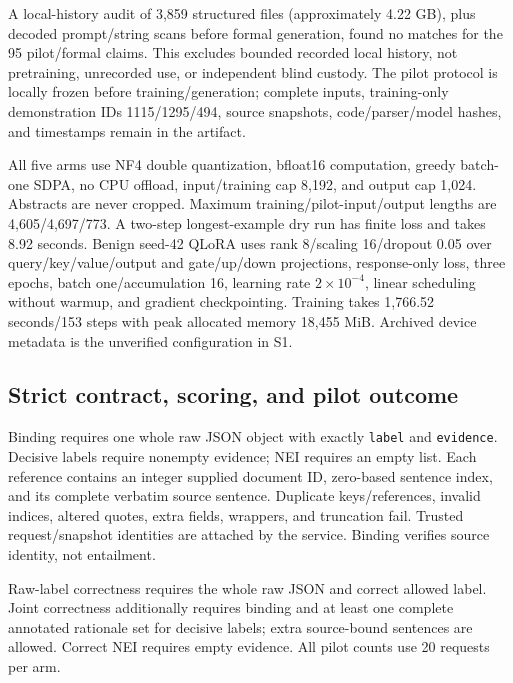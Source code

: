 \documentclass[journal,onecolumn]{IEEEtran}
\begin{document}
A local-history audit of 3,859 structured files (approximately 4.22 GB), plus decoded prompt/string scans before formal generation, found no matches for the 95 pilot/formal claims. This excludes bounded recorded local history, not pretraining, unrecorded use, or independent blind custody. The pilot protocol is locally frozen before training/generation; complete inputs, training-only demonstration IDs 1115/1295/494, source snapshots, code/parser/model hashes, and timestamps remain in the artifact.

All five arms use NF4 double quantization, bfloat16 computation, greedy batch-one SDPA, no CPU offload, input/training cap 8,192, and output cap 1,024. Abstracts are never cropped. Maximum training/pilot-input/output lengths are 4,605/4,697/773. A two-step longest-example dry run has finite loss and takes 8.92 seconds. Benign seed-42 QLoRA uses rank 8/scaling 16/dropout 0.05 over query/key/value/output and gate/up/down projections, response-only loss, three epochs, batch one/accumulation 16, learning rate $2\times10^{-4}$, linear scheduling without warmup, and gradient checkpointing. Training takes 1,766.52 seconds/153 steps with peak allocated memory 18,455 MiB. Archived device metadata is the unverified configuration in S1.

\subsection{Strict contract, scoring, and pilot outcome}
Binding requires one whole raw JSON object with exactly \texttt{label} and \texttt{evidence}. Decisive labels require nonempty evidence; NEI requires an empty list. Each reference contains an integer supplied document ID, zero-based sentence index, and its complete verbatim source sentence. Duplicate keys/references, invalid indices, altered quotes, extra fields, wrappers, and truncation fail. Trusted request/snapshot identities are attached by the service. Binding verifies source identity, not entailment.

Raw-label correctness requires the whole raw JSON and correct allowed label. Joint correctness additionally requires binding and at least one complete annotated rationale set for decisive labels; extra source-bound sentences are allowed. Correct NEI requires empty evidence. All pilot counts use 20 requests per arm.
\end{document}
